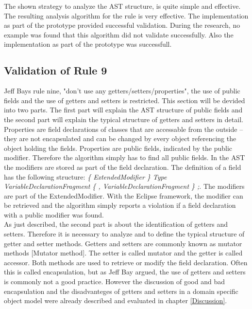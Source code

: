The shown strategy to analyze the \acf{AST} structure, is quite simple and effective. 
\\

The resulting analysis algorithm for the rule is very effective. The implementation as part of the prototype provided successful validation. During the research, no example was found that this algorithm did not validate successfully. Also the implementation as part of the prototype was successfull. 

\subsection*{Validation of Rule 9}
Jeff Bays rule nine, "don't use any getters/setters/properties", the use of public fields and the use of getters and setters is restricted. This section will be devided into two parts. The first part will explain the AST structure of public fields and the second part will explain the typical structure of getters and setters in detail.
\\

Properties are field declarations of classes that are accessable from the outside -- they are not encapsulated and can be changed by every object referencing the object holding the fields. Properties are public fields, indicated by the public modifier. Therefore the algorithm simply has to find all public fields. In the \acf{AST} the modifiers are stored as part of the field declaration. The definition of a field has the following structure: \textit{\{ ExtendedModifier \} Type VariableDeclarationFragment \{ , VariableDeclarationFragment \} ;}. The modifiers are part of the ExtendedModifier. With the Eclipse framework, the modifier can be retrieved and the algorithm simply reports a violation if a field declaration with a public modifier was found. 
\\

As just described, the second part is about the identification of getters and setters. Therefore it is necessary to analyze and to define the typical structure of getter and setter methods. Getters and setters are commonly known as mutator methods \cite{wiki}[Mutator method]. The setter is called mutator and the getter is called accessor. Both methods are used to retrieve or modify the field declaration. Often this is called encapsulation, but as Jeff Bay argued, the use of getters and setters is commonly not a good practice. However the discussion of good and bad encapsulation and the disadvanteges of getters and setters in a domain specific object model were already described and evaluated in chapter \ref{Discussion}.
\\

